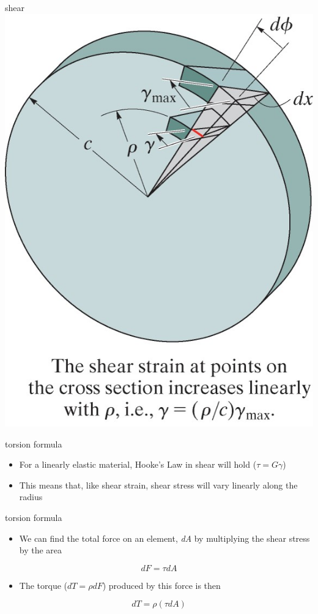 \documentclass[
  letterpaper,
  ignorenonframetext,
  aspectratio=43,
  handout,
  12pt]{beamer}
\providecommand{\tightlist}{%
  \setlength{\itemsep}{0pt}\setlength{\parskip}{0pt}}
\providecommand{\tightlist}{%
\setlength{\itemsep}{0pt}\setlength{\parskip}{0pt}}
\let\Oldincludegraphics\includegraphics
\renewcommand{\includegraphics}[2][]{\Oldincludegraphics[width=\textwidth,height=0.7\textheight,keepaspectratio]{#2}}
\begin{document}
\begin{frame}{shear}
\protect\hypertarget{shear}{}
\includegraphics{../images/torsion-disk.jpg}
\end{frame}

\begin{frame}{torsion formula}
\protect\hypertarget{torsion-formula}{}
\begin{itemize}
\tightlist
\item
  For a linearly elastic material, Hooke's Law in shear will hold
  (\(\tau = G \gamma\))
\item
  This means that, like shear strain, shear stress will vary linearly
  along the radius
\end{itemize}
\end{frame}

\begin{frame}{torsion formula}
\protect\hypertarget{torsion-formula-1}{}
\begin{itemize}
\tightlist
\item
  We can find the total force on an element, \emph{dA} by multiplying
  the shear stress by the area
\end{itemize}

\[ dF = \tau dA\]

\begin{itemize}
\tightlist
\item
  The torque (\(dT = \rho dF\)) produced by this force is then
\end{itemize}

\[dT = \rho(\tau dA)\]
\end{frame}
\end{document}
